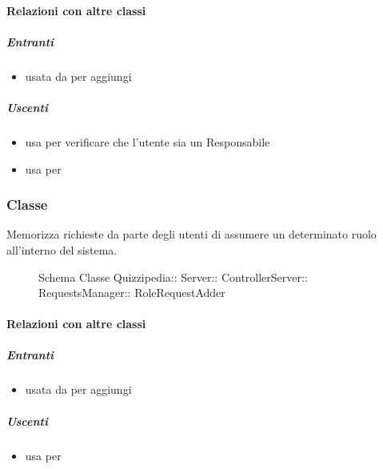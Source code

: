 \paragraph{Relazioni con altre classi}
\subparagraph{Entranti}
\begin{itemize}
\item usata da  per aggiungi
\end{itemize}
\subparagraph{Uscenti}
\begin{itemize}
\item usa  per verificare che l'utente sia un Responsabile
\item usa  per 
\end{itemize}
\subsubsection{Classe }
Memorizza richieste da parte degli utenti di assumere un determinato ruolo all'interno del sistema.
\begin{figure}[H]
\centering
\noindent{}
\caption[Schema Classe RoleRequestAdder]{Schema Classe Quizzipedia:: Server:: ControllerServer:: RequestsManager:: RoleRequestAdder}
\end{figure}
\paragraph{Relazioni con altre classi}
\subparagraph{Entranti}
\begin{itemize}
\item usata da  per aggiungi
\end{itemize}
\subparagraph{Uscenti}
\begin{itemize}
\item usa  per 
\end{itemize}
